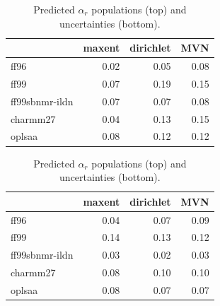 \documentclass[12pt]{article}
\begin{document}
\begin{table}

\begin{tabular}{lrrr}
\toprule
{} &  maxent &  dirichlet &  MVN \\
\midrule
ff96           &    0.02 &       0.05 & 0.08 \\
ff99           &    0.07 &       0.19 & 0.15 \\
ff99sbnmr-ildn &    0.07 &       0.07 & 0.08 \\
charmm27          &    0.04 &       0.13 & 0.15 \\
oplsaa            &    0.08 &       0.12 & 0.12 \\
\bottomrule
\end{tabular}

\begin{tabular}{lrrr}
\toprule
{} &  maxent &  dirichlet &  MVN \\
\midrule
ff96           &    0.04 &       0.07 & 0.09 \\
ff99           &    0.14 &       0.13 & 0.12 \\
ff99sbnmr-ildn &    0.03 &       0.02 & 0.03 \\
charmm27          &    0.08 &       0.10 & 0.10 \\
oplsaa            &    0.08 &       0.07 & 0.07 \\
\bottomrule
\end{tabular}

\caption{
Predicted $\alpha_r$ populations (top) and uncertainties (bottom).  
}
\end{table}

\clearpage
\end{document}
